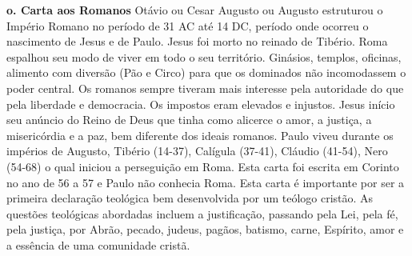 \documentclass[
]{book}
\begin{document}
\textbf{o. Carta aos Romanos}
Otávio ou Cesar Augusto ou Augusto estruturou o Império Romano no período de 31 AC até 14 DC, período onde ocorreu o nascimento de Jesus e de Paulo. Jesus foi morto no reinado de Tibério. Roma espalhou seu modo de viver em todo o seu território. Ginásios, templos, oficinas, alimento com diversão (Pão e Circo) para que os dominados não incomodassem o poder central. Os romanos sempre tiveram mais interesse pela autoridade do que pela liberdade e democracia. Os impostos eram elevados e injustos. Jesus início seu anúncio do Reino de Deus que tinha como alicerce o amor, a justiça, a misericórdia e a paz, bem diferente dos ideais romanos. Paulo viveu durante os impérios de Augusto, Tibério (14-37), Calígula (37-41), Cláudio (41-54), Nero (54-68) o qual iniciou a perseguição em Roma. Esta carta foi escrita em Corinto no ano de 56 a 57 e Paulo não conhecia Roma. Esta carta é importante por ser a primeira declaração teológica bem desenvolvida por um teólogo cristão. As questões teológicas abordadas incluem a justificação, passando pela Lei, pela fé, pela justiça, por Abrão, pecado, judeus, pagãos, batismo, carne, Espírito, amor e a essência de uma comunidade cristã.
\end{document}
